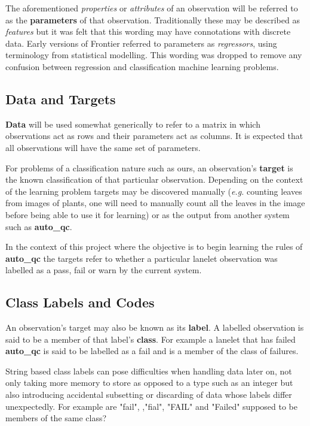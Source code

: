 The aforementioned \textit{properties} or \textit{attributes} of an observation
will be referred to as the \textbf{parameters} of that observation.
Traditionally these may be described as \textit{features} but it was felt that
this wording may have connotations with discrete data. Early versions of
Frontier referred to parameters as \textit{regressors}, using terminology from
statistical modelling. This wording was dropped to remove any confusion between
regression and classification machine learning problems.


\subsection{Data and Targets}

\textbf{Data} will be used somewhat generically to refer to a matrix in which
observations act as rows and their parameters act as columns. It is expected
that all observations will have the same set of parameters.

For problems of a classification nature such as ours, an observation's
\textbf{target} is the known classification of that particular observation.
Depending on the context of the learning problem targets may be discovered
manually (\textit{e.g.} counting leaves from images of plants, one will need to
manually count all the leaves in the image before being able to use it for
learning) or as the output from another system such as \textbf{auto\_qc}.

In the context of this project where the objective is to begin learning the
rules of \textbf{auto\_qc} the targets refer to whether a particular lanelet
observation was labelled as a pass, fail or warn by the current system.


\subsection{Class Labels and Codes}
\label{chap:labelcode}

An observation's target may also be known as its \textbf{label}. A labelled
observation is said to be a member of that label's \textbf{class}. For example a
lanelet that has failed \textbf{auto\_qc} is said to be labelled as a fail and
is a member of the class of failures.

String based class labels can pose difficulties when handling data later on, not
only taking more memory to store as opposed to a type such as an integer but
also introducing accidental subsetting or discarding of data whose labels differ
unexpectedly. For example are "fail", ,"fial", "FAIL" and "Failed" supposed to
be members of the same class?

